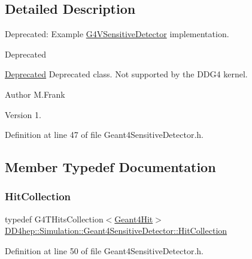 \subsection{Detailed Description}
Deprecated\+: Example \hyperlink{class_g4_v_sensitive_detector}{G4\+V\+Sensitive\+Detector} implementation. 

\begin{DoxyRefDesc}{Deprecated}
\item[\hyperlink{deprecated__deprecated000006}{Deprecated}]Deprecated class. Not supported by the D\+D\+G4 kernel.\end{DoxyRefDesc}


\begin{DoxyAuthor}{Author}
M.\+Frank 
\end{DoxyAuthor}
\begin{DoxyVersion}{Version}
1. 
\end{DoxyVersion}


Definition at line 47 of file Geant4\+Sensitive\+Detector.\+h.



\subsection{Member Typedef Documentation}
\hypertarget{class_d_d4hep_1_1_simulation_1_1_geant4_sensitive_detector_a4865cf9c96edfef8cd41e309a4cd6211}{}\label{class_d_d4hep_1_1_simulation_1_1_geant4_sensitive_detector_a4865cf9c96edfef8cd41e309a4cd6211} 
\subsubsection{\texorpdfstring{Hit\+Collection}{HitCollection}}
{\footnotesize\ttfamily typedef G4\+T\+Hits\+Collection$<$\hyperlink{class_d_d4hep_1_1_simulation_1_1_geant4_hit}{Geant4\+Hit}$>$ \hyperlink{class_d_d4hep_1_1_simulation_1_1_geant4_sensitive_detector_a4865cf9c96edfef8cd41e309a4cd6211}{D\+D4hep\+::\+Simulation\+::\+Geant4\+Sensitive\+Detector\+::\+Hit\+Collection}}



Definition at line 50 of file Geant4\+Sensitive\+Detector.\+h.

\hypertarget{class_d_d4hep_1_1_simulation_1_1_geant4_sensitive_detector_a82e16b04c44370489f88b1e6a1ef2ab0}{}\label{class_d_d4hep_1_1_simulation_1_1_geant4_sensitive_detector_a82e16b04c44370489f88b1e6a1ef2ab0} 
